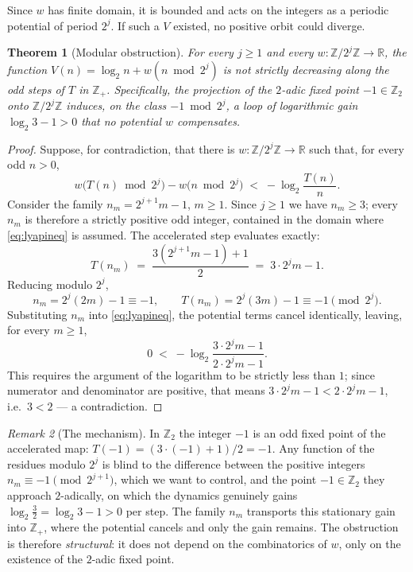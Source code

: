 \documentclass[10pt]{amsart}
\newtheorem{theorem}{Theorem}
\theoremstyle{definition}
\theoremstyle{remark}
\newtheorem{remark}[theorem]{Remark}
\newcommand{\Z}{\mathbb{Z}}
\newcommand{\R}{\mathbb{R}}
\newcommand{\Ztwo}{\Z_2}
\begin{document}
Since $w$ has finite domain, it is bounded and acts on the integers as a periodic potential of period $2^j$. If such a $V$ existed, no positive orbit could diverge.

\begin{theorem}[Modular obstruction]\label{thm:main}
For every $j\ge 1$ and every $w:\Z/2^j\Z\to\R$, the function $V(n)=\log_2 n+w(n\bmod 2^j)$ is not strictly decreasing along the odd steps of $T$ in $\Z_+$. Specifically, the projection of the $2$-adic fixed point $-1\in\Ztwo$ onto $\Z/2^j\Z$ induces, on the class $-1\bmod 2^j$, a loop of logarithmic gain $\log_2 3-1>0$ that no potential $w$ compensates.
\end{theorem}

\begin{proof}
Suppose, for contradiction, that there is $w : \Z/2^j\Z \to \R$ such that, for every odd $n > 0$,
\begin{equation}\label{eq:lyapineq}
w\bigl(T(n) \bmod 2^j\bigr) - w\bigl(n \bmod 2^j\bigr) \;<\; -\log_2 \frac{T(n)}{n}.
\end{equation}
Consider the family $n_m = 2^{j+1}m - 1$, $m \ge 1$. Since $j \ge 1$ we have $n_m \ge 3$; every $n_m$ is therefore a strictly positive odd integer, contained in the domain where \eqref{eq:lyapineq} is assumed. The accelerated step evaluates exactly:
\[
T(n_m) \;=\; \frac{3(2^{j+1}m-1)+1}{2} \;=\; 3\cdot 2^j m - 1 .
\]
Reducing modulo $2^j$,
\[
n_m = 2^j(2m) - 1 \equiv -1, \qquad
T(n_m) = 2^j(3m) - 1 \equiv -1 \pmod{2^j}.
\]
Substituting $n_m$ into \eqref{eq:lyapineq}, the potential terms cancel identically, leaving, for every $m \ge 1$,
\[
0 \;<\; -\log_2 \frac{3\cdot 2^j m - 1}{2\cdot 2^j m - 1}.
\]
This requires the argument of the logarithm to be strictly less than $1$; since numerator and denominator are positive, that means $3\cdot 2^j m - 1 < 2\cdot 2^j m - 1$, i.e.\ $3 < 2$ --- a contradiction.
\end{proof}

\begin{remark}[The mechanism]\label{rem:mechanism}
In $\Ztwo$ the integer $-1$ is an odd fixed point of the accelerated map: $T(-1) = (3\cdot(-1)+1)/2 = -1$. Any function of the residues modulo $2^j$ is blind to the difference between the positive integers $n_m \equiv -1 \pmod{2^{j+1}}$, which we want to control, and the point $-1 \in \Ztwo$ they approach $2$-adically, on which the dynamics genuinely gains $\log_2 \tfrac32 = \log_2 3 - 1 > 0$ per step. The family $n_m$ transports this stationary gain into $\Z_+$, where the potential cancels and only the gain remains. The obstruction is therefore \emph{structural}: it does not depend on the combinatorics of $w$, only on the existence of the $2$-adic fixed point.
\end{remark}
\end{document}
